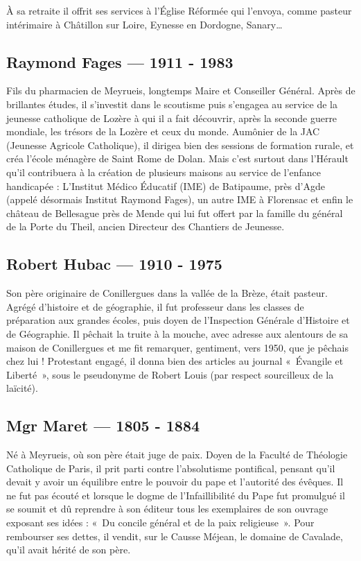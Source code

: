 À sa retraite il offrit ses services à l’Église Réformée qui l’envoya, comme pasteur
intérimaire à Châtillon sur Loire, Eynesse en Dordogne, Sanary…

\subsection{Raymond Fages --- 1911 - 1983}

Fils du pharmacien de Meyrueis, longtemps Maire et Conseiller Général. Après de
brillantes études, il s’investit dans le scoutisme puis s’engagea au service de la
jeunesse catholique de Lozère à qui il a fait découvrir, après la seconde guerre mondiale,
les trésors de la Lozère et ceux du monde.
Aumônier de la JAC (Jeunesse Agricole Catholique), il dirigea bien des sessions de
formation rurale, et créa l’école ménagère de Saint Rome de Dolan. Mais c’est
surtout dans l’Hérault qu’il contribuera à la création de plusieurs maisons au service
de l’enfance handicapée :
L’Institut Médico Éducatif (IME) de Batipaume, près d’Agde (appelé désormais
Institut Raymond Fages), un autre IME à Florensac et enfin le château de Bellesague
près de Mende qui lui fut offert par la famille du général de la Porte du Theil, ancien
Directeur des Chantiers de Jeunesse.

\subsection{Robert Hubac --- 1910 - 1975}

Son père originaire de Conillergues dans la vallée de la Brèze, était pasteur. Agrégé
d’histoire et de géographie, il fut professeur dans les classes de préparation aux
grandes écoles, puis doyen de l’Inspection Générale d’Histoire et de Géographie.
Il pêchait la truite à la mouche, avec adresse aux alentours de sa maison de
Conillergues et me fit remarquer, gentiment, vers 1950, que je pêchais chez lui !
Protestant engagé, il donna bien des articles au journal «~Évangile et Liberté~», sous
le pseudonyme de Robert Louis (par respect sourcilleux de la laïcité).

\subsection{Mgr Maret --- 1805 - 1884}

Né à Meyrueis, où son père était juge de paix. Doyen de la Faculté de Théologie
Catholique de Paris, il prit parti contre l’absolutisme pontifical, pensant qu’il devait
y avoir un équilibre entre le pouvoir du pape et l’autorité des évêques.
Il ne fut pas écouté et lorsque le dogme de l’Infaillibilité du Pape fut promulgué il se
soumit et dû reprendre à son éditeur tous les exemplaires de son ouvrage exposant
ses idées : «~Du concile général et de la paix religieuse~». Pour rembourser ses
dettes, il vendit, sur le Causse Méjean, le domaine de Cavalade, qu’il avait hérité
de son père.


